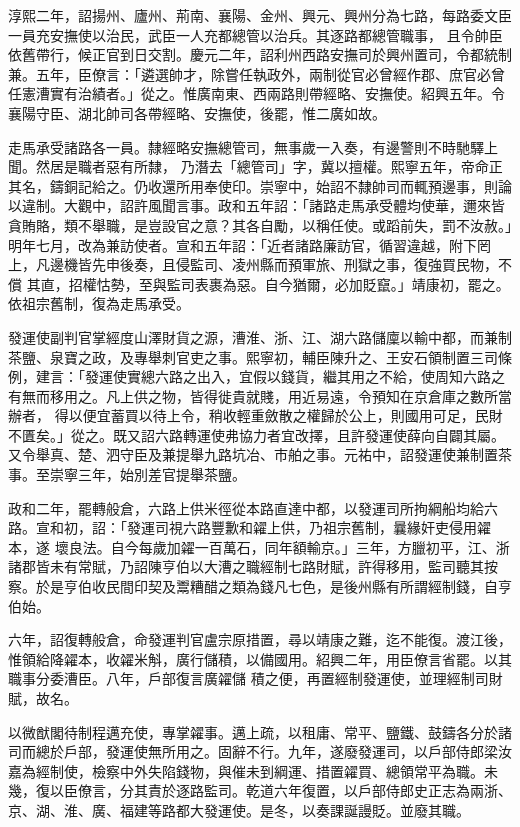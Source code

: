 \begin{pinyinscope}
 淳熙二年，詔揚州、廬州、荊南、襄陽、金州、興元、興州分為七路，每路委文臣一員充安撫使以治民，武臣一人充都總管以治兵。其逐路都總管職事，
 且令帥臣依舊帶行，候正官到日交割。慶元二年，詔利州西路安撫司於興州置司，令都統制兼。五年，臣僚言：「遴選帥才，除嘗任執政外，兩制從官必曾經作郡、庶官必曾任憲漕實有治績者。」從之。惟廣南東、西兩路則帶經略、安撫使。紹興五年。令襄陽守臣、湖北帥司各帶經略、安撫使，後罷，惟二廣如故。



 走馬承受諸路各一員。隸經略安撫總管司，無事歲一入奏，有邊警則不時馳驛上聞。然居是職者惡有所隸，
 乃潛去「總管司」字，冀以擅權。熙寧五年，帝命正其名，鑄銅記給之。仍收還所用奉使印。崇寧中，始詔不隸帥司而輒預邊事，則論以違制。大觀中，詔許風聞言事。政和五年詔：「諸路走馬承受體均使華，邇來皆貪賄賂，類不舉職，是豈設官之意？其各自勵，以稱任使。或蹈前失，罰不汝赦。」明年七月，改為兼訪使者。宣和五年詔：「近者諸路廉訪官，循習違越，附下罔上，凡邊機皆先申後奏，且侵監司、凌州縣而預軍旅、刑獄之事，復強買民物，不償
 其直，招權怙勢，至與監司表裹為惡。自今猶爾，必加貶竄。」靖康初，罷之。依祖宗舊制，復為走馬承受。



 發運使副判官掌經度山澤財貨之源，漕淮、浙、江、湖六路儲廩以輸中都，而兼制茶鹽、泉寶之政，及專舉刺官吏之事。熙寧初，輔臣陳升之、王安石領制置三司條例，建言：「發運使實總六路之出入，宜假以錢貨，繼其用之不給，使周知六路之有無而移用之。凡上供之物，皆得徙貴就賤，用近易遠，令預知在京倉庫之數所當辦者，
 得以便宜蓄買以待上令，稍收輕重斂散之權歸於公上，則國用可足，民財不匱矣。」從之。既又詔六路轉運使弗協力者宜改擇，且許發運使薛向自闢其屬。又令舉真、楚、泗守臣及兼提舉九路坑冶、市舶之事。元祐中，詔發運使兼制置茶事。至崇寧三年，始別差官提舉茶鹽。



 政和二年，罷轉般倉，六路上供米徑從本路直達中都，以發運司所拘綱船均給六路。宣和初，詔：「發運司視六路豐歉和糴上供，乃祖宗舊制，曩緣奸吏侵用糴本，遂
 壞良法。自今每歲加糴一百萬石，同年額輸京。」三年，方臘初平，江、浙諸郡皆未有常賦，乃詔陳亨伯以大漕之職經制七路財賦，許得移用，監司聽其按察。於是亨伯收民間印契及鬻糟醋之類為錢凡七色，是後州縣有所謂經制錢，自亨伯始。



 六年，詔復轉般倉，命發運判官盧宗原措置，尋以靖康之難，迄不能復。渡江後，惟領給降糴本，收糴米斛，廣行儲積，以備國用。紹興二年，用臣僚言省罷。以其職事分委漕臣。八年，戶部復言廣糴儲
 積之便，再置經制發運使，並理經制司財賦，故名。



 以微猷閣待制程邁充使，專掌糴事。邁上疏，以租庸、常平、鹽鐵、鼓鑄各分於諸司而總於戶部，發運使無所用之。固辭不行。九年，遂廢發運司，以戶部侍郎梁汝嘉為經制使，檢察中外失陷錢物，與催未到綱運、措置糴買、總領常平為職。未幾，復以臣僚言，分其責於逐路監司。乾道六年復置，以戶部侍郎史正志為兩浙、京、湖、淮、廣、福建等路都大發運使。是冬，以奏課誕謾貶。並廢其職。




\end{pinyinscope}
